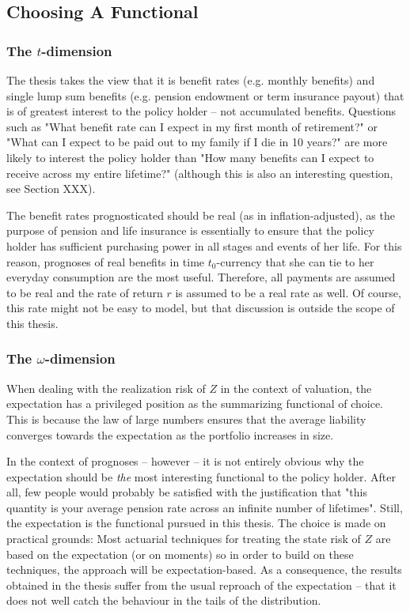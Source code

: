 \documentclass{article}
\newcommand{\1}[1]{\mathbbm{1}_{\left\lbrace #1 \right\rbrace}}
\theoremstyle{break}
\theoremstyle{remark}
\numberwithin{equation}{section}
\begin{document}
\subsection{Choosing A Functional}

\subsubsection{The $t$-dimension}

The thesis takes the view that it is benefit rates (e.g. monthly benefits) and single lump sum benefits (e.g. pension endowment or term insurance payout) that is of greatest interest to the policy holder -- not accumulated benefits. Questions such as "What benefit rate can I expect in my first month of retirement?" or "What can I expect to be paid out to my family if I die in 10 years?" are more likely to interest the policy holder than "How many benefits can I expect to receive across my entire lifetime?" (although this is also an interesting question, see Section XXX).

The benefit rates prognosticated should be real (as in inflation-adjusted), as the purpose of pension and life insurance is essentially to ensure that the policy holder has sufficient purchasing power in all stages and events of her life. For this reason, prognoses of real benefits in time $t_0$-currency that she can tie to her everyday consumption are the most useful. Therefore, all payments are assumed to be real and the rate of return $r$ is assumed to be a real rate as well. Of course, this rate might not be easy to model, but that discussion is outside the scope of this thesis.

\subsubsection{The $\omega$-dimension}

When dealing with the realization risk of $Z$ in the context of valuation, the expectation has a privileged position as the summarizing functional of choice. This is because the law of large numbers ensures that the average liability converges towards the expectation as the portfolio increases in size.

In the context of prognoses -- however -- it is not entirely obvious why the expectation should be \textit{the} most interesting functional to the policy holder. After all, few people would probably be satisfied with the justification that "this quantity is your average pension rate across an infinite number of lifetimes". Still, the expectation is the functional pursued in this thesis. The choice is made on practical grounds: Most actuarial techniques for treating the state risk of $Z$ are based on the expectation (or on moments) so in order to build on these techniques, the approach will be expectation-based. As a consequence, the results obtained in the thesis suffer from the usual reproach of the expectation -- that it does not well catch the behaviour in the tails of the distribution.
\end{document}
